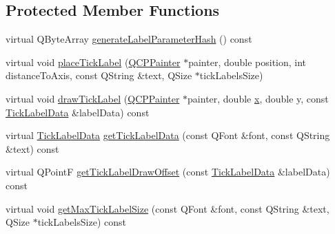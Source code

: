\subsection*{Protected Member Functions}
\begin{DoxyCompactItemize}
\item 
virtual Q\+Byte\+Array \hyperlink{classQCPAxisPainterPrivate_a91a023bbefe1c3bf330570c0b985de84}{generate\+Label\+Parameter\+Hash} () const 
\item 
virtual void \hyperlink{classQCPAxisPainterPrivate_af8fe7350c19575bc33ca770f9b3a15fd}{place\+Tick\+Label} (\hyperlink{classQCPPainter}{Q\+C\+P\+Painter} $\ast$painter, double position, int distance\+To\+Axis, const Q\+String \&text, Q\+Size $\ast$tick\+Labels\+Size)
\item 
virtual void \hyperlink{classQCPAxisPainterPrivate_ad8f2f12cd35b8189e8bf96679e873933}{draw\+Tick\+Label} (\hyperlink{classQCPPainter}{Q\+C\+P\+Painter} $\ast$painter, double \hyperlink{qualification__task_8cpp_a6150e0515f7202e2fb518f7206ed97dc}{x}, double y, const \hyperlink{structQCPAxisPainterPrivate_1_1TickLabelData}{Tick\+Label\+Data} \&label\+Data) const 
\item 
virtual \hyperlink{structQCPAxisPainterPrivate_1_1TickLabelData}{Tick\+Label\+Data} \hyperlink{classQCPAxisPainterPrivate_ad9f24fbcbf9d8c92b34d9d00b010e6a3}{get\+Tick\+Label\+Data} (const Q\+Font \&font, const Q\+String \&text) const 
\item 
virtual Q\+PointF \hyperlink{classQCPAxisPainterPrivate_a6b02e6fd70cc65f726ca8cb3e6f16de4}{get\+Tick\+Label\+Draw\+Offset} (const \hyperlink{structQCPAxisPainterPrivate_1_1TickLabelData}{Tick\+Label\+Data} \&label\+Data) const 
\item 
virtual void \hyperlink{classQCPAxisPainterPrivate_a8a7c82303e272485621fde78a5b674f9}{get\+Max\+Tick\+Label\+Size} (const Q\+Font \&font, const Q\+String \&text, Q\+Size $\ast$tick\+Labels\+Size) const 
\end{DoxyCompactItemize}
